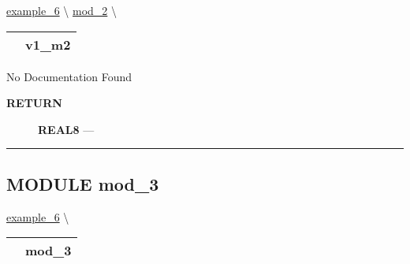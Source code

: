\hypertarget{ecldoc:intest.in1intest.example_6.mod_2.v1_m2}{}
\hspace{0pt} \hyperlink{ecldoc:intest.in1intest.example_6}{example_6} \textbackslash 
\hspace{0pt} \hyperlink{ecldoc:intest.in1intest.example_6.mod_2}{mod_2} \textbackslash 

{\renewcommand{\arraystretch}{1.5}
\begin{tabularx}{\textwidth}{|>{\raggedright\arraybackslash}l|X|}
\hline
\hspace{0pt}\mytexttt{\color{red} } & \textbf{v1\_m2} \\
\hline
\end{tabularx}
}

\par





No Documentation Found








\par
\begin{description}
\item [\colorbox{tagtype}{\color{white} \textbf{\textsf{RETURN}}}] \textbf{REAL8} --- 
\end{description}




\rule{\linewidth}{0.5pt}


\subsection*{\textsf{\colorbox{headtoc}{\color{white} MODULE}
mod\_3}}

\hypertarget{ecldoc:intest.in1intest.example_6.mod_3}{}
\hspace{0pt} \hyperlink{ecldoc:intest.in1intest.example_6}{example_6} \textbackslash 

{\renewcommand{\arraystretch}{1.5}
\begin{tabularx}{\textwidth}{|>{\raggedright\arraybackslash}l|X|}
\hline
\hspace{0pt}\mytexttt{\color{red} } & \textbf{mod\_3} \\
\hline
\end{tabularx}
}

\par






